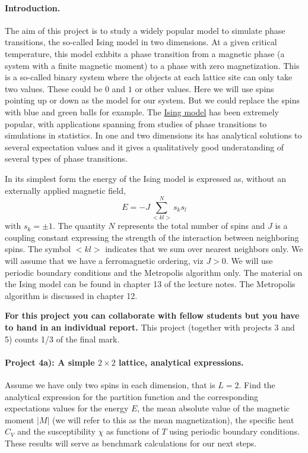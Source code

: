 \documentclass[%
oneside,                 %
final,                   %
10pt]{article}
\begin{document}
\paragraph{Introduction.}
The aim of this project is to study a widely popular model to simulate phase transitions, the so-called Ising model in two dimensions. At a given critical temperature, this model exhbits a phase transition from a magnetic phase (a system with a finite magnetic moment) to a phase with zero magnetization.
This is a so-called binary system where the objects at each lattice site can only take two values. These could be $0$ and $1$ or other values. Here we will use spins pointing up or down as the model for our system. But we could replace the spins with blue and green balls for example.
The \href{{https://en.wikipedia.org/wiki/Ising_model}}{Ising model} has been extremely popular, with applications spanning from studies of phase transitions to simulations in statistics. In one and two dimensions its has analytical solutions to several expectation values and it gives a qualitatively  good underatanding of several types of phase transitions.  

In its simplest form
the energy of the Ising model is expressed as, without an externally applied magnetic field, 
\[
E=-J\sum_{< kl >}^{N}s_ks_l 
\]
with
$s_k=\pm 1$. The quantity $N$ represents the total number of spins and $J$ is a coupling
constant expressing the strength of the interaction between
neighboring spins.  The symbol $<kl>$ indicates that we sum over
nearest neighbors only. We will assume that we have a ferromagnetic
ordering, viz $J> 0$.  We will use periodic boundary conditions and
the Metropolis algorithm only. The material on the Ising model can be found in chapter 13 of the lecture notes. The Metropolis algorithm is discussed in chapter 12. 


\textbf{For this project you can collaborate with fellow students but you have to hand in an individual report.}
This project (together with projects 3 and 5) counts 1/3 of the final mark.

\paragraph{Project 4a): A simple $2\times 2$ lattice, analytical expressions.}
Assume we have only two spins in each dimension, that is $L=2$.
Find the analytical expression 
for the partition function and the corresponding
expectations values for the energy $E$, the mean absolute value of the magnetic moment $\vert M\vert$ (we will refer to this as the mean magnetization), 
the specific heat $C_V$ and the susceptibility $\chi$ 
as functions of  $T$ using periodic boundary conditions. These results will serve as benchmark calculations for our next steps.
\end{document}
